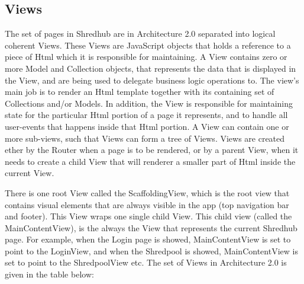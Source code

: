 \subsection{Views}
The set of pages in Shredhub are in Architecture 2.0 separated into logical coherent Views. These Views are JavaScript objects that holds a reference to a piece of Html  which it is responsible for maintaining. A View  contains zero or more Model and Collection objects, that represents the data that is displayed in the View, and are being used to delegate business logic operations to. The view's main job is to render an Html template together with its containing set of Collections and/or Models. In addition, the View is responsible for maintaining state for the particular Html portion of a page it represents, and to handle all user-events that happens inside that Html portion. A View can contain one or more sub-views, such that Views can form a tree of Views. Views are created ether by the Router when a page is to be rendered, or by a parent View, when it needs to create a child View that will renderer a smaller part of Html inside the current View.

There is one root View called the ScaffoldingView, which is the root view that contains visual elements that are always visible in the app (top navigation bar and footer). This View wraps one single child View. This child view (called the MainContentView), is the always the View that represents the current Shredhub page. For example, when the Login page is showed, MainContentView is set to point to the LoginView, and  when the Shredpool is showed, MainContentView is set to point to the ShredpoolView etc. The set of Views in Architecture 2.0 is given in the table below:

